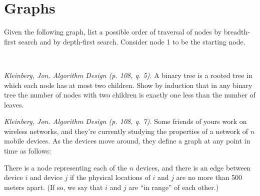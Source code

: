 \documentclass[answers]{exam}  %
\begin{document}
\begin{questions}
\begin{parts}
\begin{solutionbox}{2.95in}
\end{solutionbox}

\end{parts}


\pagebreak
\section*{Graphs}

\question Given the following graph, list a possible order of traversal of nodes by breadth-first search and by depth-first search. Consider node 1 to be the starting node.

\begin{minipage}{0.3\linewidth}
\end{minipage}
\qquad
\begin{minipage}{0.6\linewidth}
\begin{solutionbox}{1.7in}    \vspace{1em} \\
 
\end{solutionbox}
\end{minipage}

\question \textit{Kleinberg, Jon. Algorithm Design (p. 108, q. 5).} A binary tree is a rooted tree in which each node has at most two children. Show by induction that in any binary tree the number of nodes with two children is exactly one less than the number of leaves. 

\nopagebreak

\begin{solutionbox}{5in}    \vspace{1em}                                             

\end{solutionbox}


\pagebreak
\question \textit{Kleinberg, Jon. Algorithm Design (p. 108, q. 7).} Some friends of yours work on wireless networks, and they're currently studying the properties of a network of $n$ mobile devices. As the devices move around, they define a graph at any point in time as follows: 

{\leftskip=1cm\relax
 \rightskip=1cm\relax
 There is a node representing each of the $n$ devices, and there is an edge between device $i$ and device $j$ if the physical locations of $i$ and $j$ are no more than 500 meters apart. (If so, we say that $i$ and $j$ are “in range” of each other.)
 \par}


\end{questions}
\end{document}
